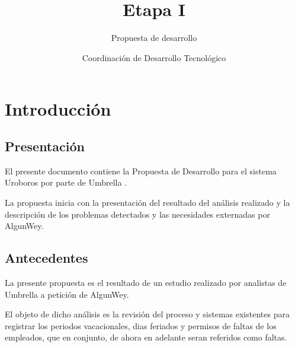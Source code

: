 \documentclass[10pt]{book}
\title{\nombreProyecto\\ Etapa I}
\subtitle{\bigskip Propuesta de desarrollo}
\author{Coordinación de Desarrollo Tecnológico}
\newcommand{\nombreProyecto}{Uroboros }
\newcommand{\empresa}{Umbrella }
\newcommand{\cliente}{AlgunWey}
\begin{document}
\pagestyle{empty}
\maketitle
\frontmatter
\tableofcontents
\mainmatter
\pagestyle{fancy}


\chapter{Introducción} 

\section{Presentación}

	El presente documento contiene la Propuesta de Desarrollo para el sistema \nombreProyecto      por parte de  \empresa.
	
	La propuesta inicia con la presentación del resultado del análisis realizado y la descripción de los problemas detectados y las necesidades externadas por \cliente.

\section{Antecedentes} 


	La presente propuesta es el resultado de un estudio realizado por analistas de \empresa a petición de \cliente.
	
	El objeto de dicho análisis es la revisión del proceso y sistemas existentes para registrar los periodos vacacionales, dias feriados y permisos de faltas de los empleados, que en conjunto, de ahora en adelante seran referidos como faltas. 
	
\end{document}
